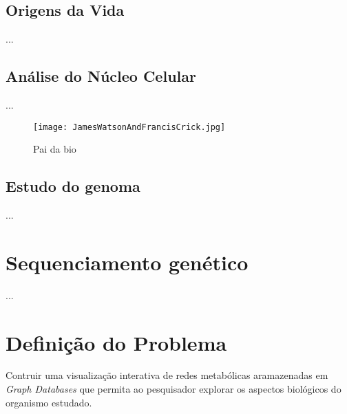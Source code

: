 

\subsection{Origens da Vida}

\indent ...

\subsection{Análise do Núcleo Celular}

\indent ...

\vspace{1cm}
 \begin{figure}[h!]
     \centering
     \texttt{[image: JamesWatsonAndFrancisCrick.jpg]}
     \caption{Pai da bio}
     \label{fig:JamesWatsonAndFrancisCrick}
 \end{figure}
\vspace{1cm}

\subsection{Estudo do genoma}

\indent ... 




\section{Sequenciamento genético}

\indent ...


\section{Definição do Problema}

\indent 
Contruir uma visualização interativa de redes metabólicas aramazenadas em \textit{Graph Databases} que permita ao pesquisador explorar os aspectos biológicos do organismo estudado.



